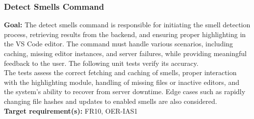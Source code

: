 \documentclass[12pt, titlepage]{article}
\begin{document}
  \subsubsection{Detect Smells Command}

  \textbf{Goal:} The detect smells command is responsible for
  initiating the smell detection process, retrieving results from the
  backend, and ensuring proper highlighting in the VS Code editor.
  The command must handle various scenarios, including caching,
  missing editor instances, and server failures, while providing
  meaningful feedback to the user. The following unit tests verify
  its accuracy.\\

  \noindent The tests assess the correct fetching and caching of
  smells, proper interaction with the highlighting module, handling
  of missing files or inactive editors, and the system's ability to
  recover from server downtime. Edge cases such as rapidly changing
  file hashes and updates to enabled smells are also considered.\\

  \noindent\textbf{Target requirement(s):} FR10, OER-IAS1~\cite{SRS} \\
\end{document}
